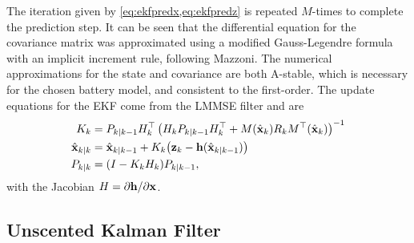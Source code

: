 \documentclass[../zhang_thesis.tex]{subfiles}
\begin{document}
The iteration given by \cref{eq:ekfpredx,eq:ekfpredz} is repeated $M$-times to complete the prediction step.  It can be seen that the differential equation for the covariance matrix was approximated using a modified Gauss-Legendre formula with an implicit increment rule, following Mazzoni. The numerical approximations for the state and covariance are both A-stable, which is necessary for the chosen battery model, and consistent to the first-order. 
The update equations for the EKF come from the LMMSE filter and are
\begin{align}
    K_k &= P_{k|k-1} H_k^\top \left( H_k P_{k|k-1} H_k^\top + M(\hat{\mathbf{x}}_k) R_k M^\top(\hat{\mathbf{x}}_k) \right)^{-1} \\
    \hat{\mathbf{x}}_{k|k} &= \hat{\mathbf{x}}_{k|k-1} + K_k \big( \mathbf{z}_k - \mathbf{h}(\hat{\mathbf{x}}_{k|k-1}) \big) \\
    P_{k|k} &= (I - K_k H_k) P_{k|k-1}, \label{eq:ekf_l}
\end{align}
with the Jacobian $H=\partial\mathbf{h}/\partial\mathbf{x}$.

\subsection{Unscented Kalman Filter}
\end{document}
